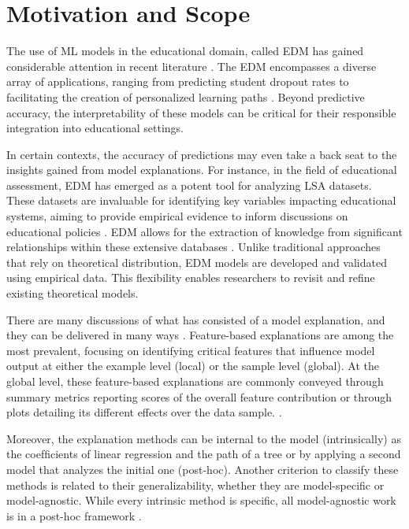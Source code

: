 \section{Motivation and Scope}
\label{motivacao}

The use of \gls{ML} models in the educational domain, called \gls{EDM} has gained considerable attention in recent literature \cite{Romero2020EducationalSurvey}. The \gls{EDM} encompasses a diverse array of applications, ranging from predicting student dropout rates \cite{Araque2009FactorsRates, Aguiar2015WhoWhy} to facilitating the creation of personalized learning paths \cite{Fancsali2018IntelligentOffs}. Beyond predictive accuracy, the interpretability of these models can be critical for their responsible integration into educational settings.

In certain contexts, the accuracy of predictions may even take a back seat to the insights gained from model explanations. For instance, in the field of educational assessment, \gls{EDM} has emerged as a potent tool for analyzing \gls{LSA} datasets. These datasets are invaluable for identifying key variables impacting educational systems, aiming to provide empirical evidence to inform discussions on educational policies  \cite{Hernandez-Torrano2021ModernLiteratureb}. \gls{EDM} allows for the extraction of knowledge from significant relationships within these extensive databases \cite{Gamazo2020AnTechniques}. Unlike traditional approaches that rely on theoretical distribution, \gls{EDM} models are developed and validated using empirical data. This flexibility enables researchers to revisit and refine existing theoretical models\cite{Huang2003InstitutePolicymakers}.

There are many discussions of what has consisted of a model explanation, and they can be delivered in many ways \cite{Guidotti2018AModels}. Feature-based explanations are among the most prevalent, focusing on identifying critical features that influence model output at either the example level (local) or the sample level (global). At the global level, these feature-based explanations are commonly conveyed through summary metrics reporting scores of the overall feature contribution or through plots detailing its different effects over the data sample. \cite{SilvaFilho2023AAchievement}.

Moreover, the explanation methods can be internal to the model (intrinsically) as the coefﬁcients of linear regression and the path of a tree or by applying a second model that analyzes the initial one (post-hoc). Another criterion to classify these methods is related to their generalizability, whether they are model-speciﬁc or model-agnostic. While every intrinsic method is speciﬁc, all model-agnostic work is in a post-hoc framework \cite{SilvaFilho2021InterpretingEffects}.

